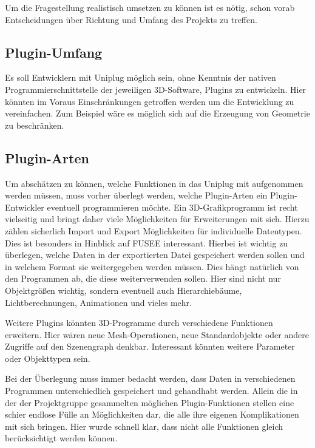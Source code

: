  \label{sec:Vorueberlegungen}

Um die Fragestellung realistisch umsetzen zu können ist es nötig, schon vorab Entscheidungen über Richtung und Umfang des Projekts zu treffen.

\subsection{Plugin-Umfang}
Es soll Entwicklern mit Uniplug möglich sein, ohne Kenntnis der nativen Programmierschnittstelle der jeweiligen 3D-Software, Plugins zu entwickeln. Hier könnten im Voraus Einschränkungen getroffen werden um die Entwicklung zu vereinfachen. Zum Beispiel wäre es möglich sich auf die Erzeugung von Geometrie zu beschränken.

\subsection{Plugin-Arten}
Um abschätzen zu können, welche Funktionen in das Uniplug mit aufgenommen werden müssen, muss vorher überlegt werden, welche Plugin-Arten ein Plugin-Entwickler eventuell programmieren möchte. Ein 3D-Grafikprogramm ist recht vielseitig und bringt daher viele Möglichkeiten für Erweiterungen mit sich. Hierzu zählen sicherlich Import und Export Möglichkeiten für individuelle Datentypen. Dies ist besonders in Hinblick auf FUSEE interessant. Hierbei ist wichtig zu überlegen, welche Daten in der exportierten Datei gespeichert werden sollen und in welchem Format sie weitergegeben werden müssen. Dies hängt natürlich von den Programmen ab, die diese weiterverwenden sollen. Hier sind nicht nur Objektgrößen wichtig, sondern eventuell auch Hierarchiebäume, Lichtberechnungen, Animationen und vieles mehr.

Weitere Plugins könnten 3D-Programme durch verschiedene Funktionen erweitern. Hier wären neue Mesh-Operationen, neue Standardobjekte oder andere Zugriffe auf den Szenengraph denkbar. Interessant könnten weitere Parameter oder Objekttypen sein.

Bei der Überlegung muss immer bedacht werden, dass Daten in verschiedenen Programmen unterschiedlich gespeichert und gehandhabt werden. Allein die in der der Projektgruppe gesammelten möglichen Plugin-Funktionen stellen eine schier endlose Fülle an Möglichkeiten dar, die alle ihre eigenen Komplikationen mit sich bringen. Hier wurde schnell klar, dass nicht alle Funktionen gleich berücksichtigt werden können.
 
